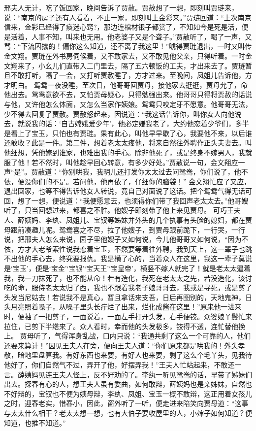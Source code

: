 \documentclass[12pt,oneside]{book}
\begin{document}
邢夫人无计，吃了饭回家，晚间告诉了贾赦。贾赦想了一想，即刻叫贾琏来，说：“南京的房子还有人看着，不止一家，即刻叫上金彩来。”贾琏回道：“上次南京信来，金彩已经得了痰迷心窍?，那边连棺材银子都赏了，不知如今是死是活，便是活着，人事不知，叫来也无用。他老婆子又是个聋子。”贾赦听了，喝了一声，又骂：“下流囚攮的！偏你这么知道，还不离了我这里！”唬得贾琏退出，一时又叫传金文翔。贾琏在外书房伺候着，又不敢家去，又不敢见他父亲，只得听着。一时金文翔来了，小幺儿们直带入二门里去，隔了五六顿饭的工夫，才出来去了。贾琏暂且不敢打听，隔了一会，又打听贾赦睡了，方才过来。至晚间，凤姐儿告诉他，方才明白。
鸳鸯一夜没睡，至次日，他哥哥回贾母，接他家去逛逛，贾母允了，命他出去。鸳鸯意欲不去，又怕贾母疑心，只得勉强出来。他哥哥只得将贾赦的话说与他，又许他怎么体面，又怎么当家作姨娘。鸳鸯只咬定牙不愿意。他哥哥无法，少不得去回复了贾赦。贾赦怒起来，因说道：“我这话告诉你，叫你女人向他说去，就说我的话：‘自古嫦娥爱少年’，他必定嫌我老了，大约他恋着少爷们，多半是看上了宝玉，只怕也有贾琏。果有此心，叫他早早歇了心，我要他不来，以后谁还敢收？此是一件。第二件，想着老太太疼他，将来自然往外聘作正头夫妻去。叫他细想，凭他嫁到谁家，也难出我的手心。除非他死了，或是终身不嫁男人，我就服了他！若不然时，叫他趁早回心转意，有多少好处。”贾赦说一句，金文翔应一声“是”。贾赦道：“你别哄我，我明儿还打发你太太过去问鸳鸯，你们说了，他不依，便没你们的不是。若问他，他再依了，仔细你的脑袋！”
金文翔忙应了又应，退出回家，也等不得告诉他女人转说，竟自己对面说了这话。把个鸳鸯气得无话可回，想了一想，便说道：“我便愿意去，也须得你们带了我回声老太太去。”他哥嫂听了，只当回想过来，都喜之不胜。他嫂子即刻带了他上来见贾母。
可巧王夫人、薛姨妈、李纨、凤姐儿、宝钗等姊妹并外头的几个执事有头脸的媳妇，都在贾母跟前凑趣儿呢。鸳鸯喜之不尽，拉了他嫂子，到贾母跟前跪下，一行哭，一行说，把邢夫人怎么来说，园子里他嫂子又如何说，今儿他哥哥又如何说，“因为不依，方才大老爷索性说我恋着宝玉，不然要等着往外聘，我到天上，这一辈子也跳不出他的手心去，终究要报仇。我是横了心的，当着众人在这里，我这一辈子莫说是‘宝玉’，便是‘宝金’‘宝银’‘宝天王’‘宝皇帝’，横竖不嫁人就完了！就是老太太逼着我，我一刀抹死了，也不能从命！若有造化，我死在老太太之先，若没造化，该讨吃的命，服侍老太太归了西，我也不跟着我老子娘哥哥去，我或是寻死，或是剪了头发当尼姑去！若说我不是真心，暂且拿话来支吾，日后再图别的，天地鬼神，日头月亮照着嗓子，从嗓子里头长疔烂了出来，烂化成酱在这里！”原来他一进来时，便袖了一把剪子，一面说着，一面左手打开头发，右手便铰。众婆娘丫鬟忙来拉住，已剪下半绺来了。众人看时，幸而他的头发极多，铰得不透，连忙替他挽上。
贾母听了，气得浑身乱战，口内只说：“我通共剩了这么一个可靠的人，他们还要来算计！”因见王夫人在旁，便向王夫人道：“你们原来都是哄我的！外头孝敬，暗地里盘算我。有好东西也来要，有好人也来要，剩了这么个毛丫头，见我待他好了，你们自然气不过，弄开了他，好摆弄我！”王夫人忙站起来，不敢还一言。薛姨妈见连王夫人怪上，反不好劝的了。李纨一听见鸳鸯的话，早带了姊妹们出去。探春有心的人，想王夫人虽有委曲，如何敢辩，薛姨妈也是亲姊妹，自然也不好辩的，宝钗也不便为姨母辩，李纨、凤姐、宝玉一概不敢辩，这正用着女孩儿之时，迎春老实，惜春小，因此，窗外听了一听，便走进来陪笑向贾母道：“这事与太太什么相干？老太太想一想，也有大伯子要收屋里的人，小婶子如何知道？便知道，也推不知道。”
\end{document}

